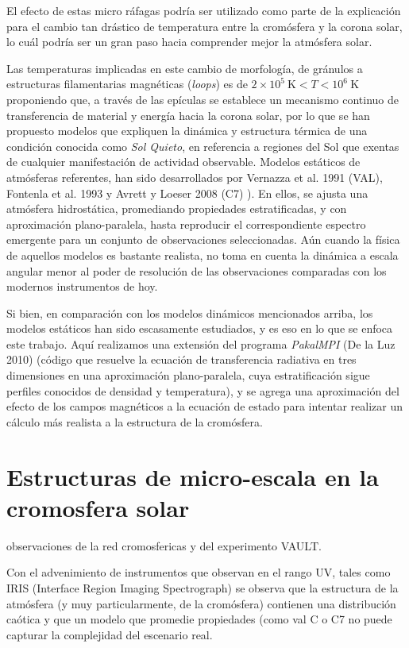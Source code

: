\documentclass[9pt]{book}
\begin{document}
El efecto de estas micro r\'afagas podr\'ia ser utilizado como parte de la explicaci\'on para el cambio tan dr\'astico de temperatura entre la crom\'osfera y la corona solar, lo cu\'al podr\'ia ser un gran paso hacia comprender mejor la atm\'osfera solar.

Las temperaturas implicadas en este cambio de morfolog\'ia, de gr\'anulos a estructuras filamentarias magn\'eticas (\emph{loops}) es de $2\times 10^5~\mbox{K} < T < 10^6~\mbox{K}$ proponiendo que, a trav\'es de las ep\'iculas se establece un mecanismo continuo de transferencia de material y energ\'ia hacia la corona solar, por lo que se han propuesto modelos que expliquen la din\'amica y estructura t\'ermica de una condici\'on conocida como \emph{Sol Quieto}, en referencia a regiones del Sol que exentas de cualquier manifestaci\'on de actividad observable. Modelos est\'aticos de atm\'osferas referentes, han sido desarrollados por Vernazza et al. 1991 (VAL)\cite{VAULT1}, Fontenla et al. 1993 y Avrett y Loeser 2008 (C7) \cite{C7}). En ellos, se ajusta una atm\'osfera hidrost\'atica, promediando propiedades estratificadas, y con aproximaci\'on plano-paralela, hasta reproducir el correspondiente espectro emergente para un conjunto de observaciones seleccionadas. A\'un cuando la f\'isica de aquellos modelos es bastante realista, no toma en cuenta la din\'amica a escala angular menor al poder de resoluci\'on de las observaciones comparadas con los modernos instrumentos de hoy. 

Si bien, en comparaci\'on con los modelos din\'amicos mencionados arriba, los modelos est\'aticos han sido escasamente estudiados, y es eso en lo que se enfoca este trabajo. Aqu\'i realizamos una extensi\'on del programa \emph{PakalMPI} (De la Luz 2010) (c\'odigo que resuelve la ecuaci\'on de transferencia radiativa en tres dimensiones en una aproximaci\'on plano-paralela, cuya estratificaci\'on sigue perfiles conocidos de densidad y temperatura), y se agrega una aproximaci\'on del efecto de los campos magn\'eticos a la ecuaci\'on de estado para intentar realizar un c\'alculo m\'as realista a la estructura de la crom\'osfera.

\section{Estructuras de micro-escala en la cromosfera solar}
observaciones de la red cromosfericas y del experimento VAULT.
%

Con el advenimiento de instrumentos que observan en el rango UV, tales como IRIS (Interface Region Imaging Spectrograph) se observa que la estructura de la atm\'osfera (y muy particularmente, de la crom\'osfera) contienen una distribuci\'on ca\'otica y que un modelo que promedie propiedades (como val C o C7 no puede capturar la complejidad del escenario real.
\end{document}
